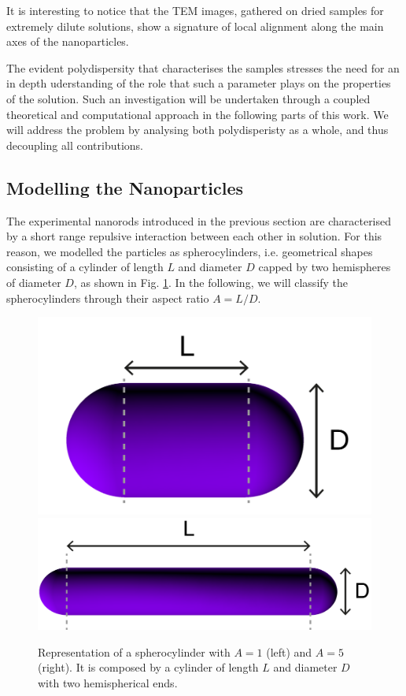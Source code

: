 \documentclass[journal=jacsat,manuscript=article]{achemso}
\begin{document}

It is interesting to notice that the TEM images, gathered on dried samples for extremely dilute solutions, show a signature of local alignment along the main axes of the nanoparticles. 

The evident polydispersity that characterises the samples stresses the need for an in depth uderstanding of the role that such a parameter plays on the properties of the solution. Such an investigation will be undertaken through a coupled theoretical and computational approach in the following parts of this work. We will address the problem by analysing both polydisperisty as a whole, and thus decoupling all contributions. 


\subsection{Modelling  the Nanoparticles}

The experimental nanorods introduced in the previous section are characterised by a short range repulsive interaction between each other in solution. For this reason, we modelled the particles as spherocylinders, i.e. geometrical shapes consisting of a cylinder of length $L$ and diameter $D$ capped by two hemispheres of diameter $D$, as shown in Fig. \ref{fig:HSC_model}. In the following, we will classify the spherocylinders through their aspect ratio $A = L/D$.

\begin{figure}[!ht]
    \centering
    \includegraphics[width=0.25 \columnwidth]{Figures/A1_scheme.png}
    \includegraphics[width=0.45 \columnwidth]{Figures/A5_scheme.png}
    \caption{Representation of a spherocylinder with $A = 1$ (left) and $A = 5$ (right). It is composed by a cylinder of length $L$ and diameter $D$ with two hemispherical ends.}
    \label{fig:HSC_model}
\end{figure}
\end{document}
